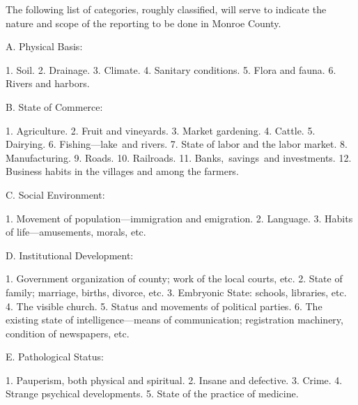 \documentclass[openany,nobib]{tufte-book}
\begin{document}
The following list of categories, roughly classified, will serve to
indicate the nature and scope of the reporting to be done in Monroe
County.~

\vspace{.05in}

A. Physical Basis:~

1. Soil. 2. Drainage. 3. Climate. 4. Sanitary conditions. 5. Flora and
fauna. 6. Rivers and harbors.~

\vspace{.05in}

B. State of Commerce:~

1. Agriculture. 2. Fruit and vineyards. 3. Market gardening. 4. Cattle.
5. Dairying. 6. Fishing---lake~and rivers. 7. State of labor and the
labor market. 8. Manufacturing. 9. Roads. 10. Railroads. 11.
Banks,~savings~and investments. 12. Business habits in the villages and
among the farmers.~

\vspace{.05in}

C. Social Environment:~

1. Movement of population---immigration and emigration. 2. Language. 3.
Habits of life---amusements, morals, etc.~

\vspace{.05in}

D. Institutional Development:~

1. Government organization of county; work of the local courts, etc. 2.
State of family; marriage, births, divorce, etc. 3. Embryonic State:
schools, libraries, etc. 4. The visible church. 5. Status and movements
of political parties. 6. The existing state of intelligence---means of
communication; registration machinery, condition of newspapers, etc.~

\vspace{.05in}

E. Pathological Status:~

1. Pauperism, both physical and spiritual. 2. Insane and defective. 3.
Crime. 4. Strange psychical developments. 5. State of the practice of
medicine.~

\vspace{.05in}
\end{document}
